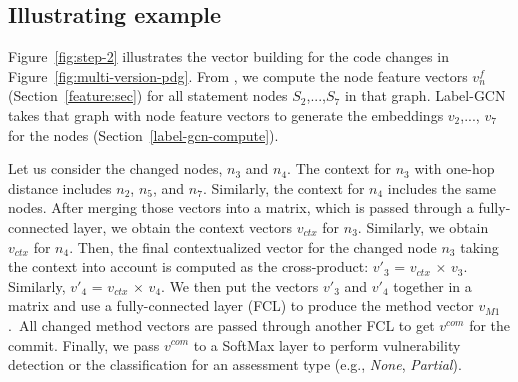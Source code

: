 
\subsection{Illustrating example}

Figure~\ref{fig:step-2} illustrates the vector building for the code
changes in Figure~\ref{fig:multi-version-pdg}. From
{\mvpdgxy}, we compute the node feature vectors $v^{f}_n$
(Section~\ref{feature:sec}) for all statement nodes $S_2$,...,$S_7$ in
that graph. Label-GCN takes that graph with node feature vectors to
generate the embeddings $v_2$,..., $v_7$ for the nodes
(Section~\ref{label-gcn-compute}).


Let us consider the changed nodes, $n_3$ and $n_4$. The context for
$n_3$ with one-hop distance includes $n_2$, $n_5$, and
$n_7$. Similarly, the context for $n_4$ includes the same nodes. After
merging those vectors into a matrix, which is passed through a
fully-connected layer, we obtain the context vectors $v_{ctx}$ for
$n_3$. Similarly, we obtain $v_{ctx}$ for $n_4$. Then, the final
contextualized vector for the changed node $n_3$ taking the context
into account is computed as the cross-product: $v'_3$ = $v_{ctx}$
$\times$ $v_3$. Similarly, $v'_4$ = $v_{ctx}$ $\times$ $v_4$.
%
We then put the vectors $v'_3$ and $v'_4$ together in a matrix and use
a fully-connected layer (FCL) to produce the method vector
$v_{M1}$.~All changed method vectors are passed through another FCL to
get $v^{com}$ for the commit. Finally, we pass $v^{com}$ to a SoftMax
layer to perform vulnerability detection or the classification for an
assessment type (e.g., {\em None}, {\em Partial}).

